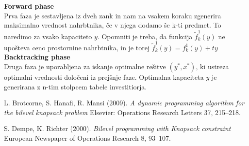 \documentclass[a4paper, 11pt]{article}
\begin{document}
	\textbf{Forward phase} \\
	Prva faza je sestavljena iz dveh zank in nam na vsakem koraku zgenerira maksimalno vrednost nahrbtnika, če v njega dodamo še k-ti predmet. To naredimo za vsako kapaciteto $y$. Opomniti je treba, da funkcija  $\widetilde{f}^{1}_{k}(y)$ ne upošteva ceno prostornine nahrbtnika, in je torej   $\widetilde{f}^{1}_{k}(y) = f^{1}_{k}(y)+ty$ \\

	\textbf{Backtracking phase} \\
	Druga faza je uporabljena za iskanje optimalne rešitve $(y^*, x^*)$, ki ustreza optimalni vrednosti določeni iz prejšnje faze. Optimalna kapaciteta $y$ je generirana z n-tim stolpcem tabele investitiorja.

	
	
		\pagebreak


		
		\begin{thebibliography}{9}
		
			 L. Brotcorne, S. Hanafi, R. Mansi (2009).
			\textit{A dynamic programming algorithm for the bilevel knapsack problem} Elsevier: Operations Research Letters 37, 215–218.
			
    			 S. Dempe, K. Richter (2000). 
			\textit{Bilevel programming with Knapsack constraint} European Newspaper of Operations Research 8, 93–107.
			
		\end{thebibliography}
	
	
	
	
\end{document}
